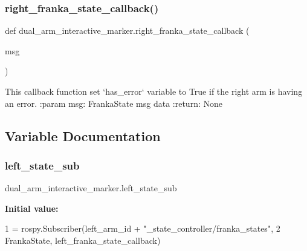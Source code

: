 \subsubsection{\texorpdfstring{right\+\_\+franka\+\_\+state\+\_\+callback()}{right\_franka\_state\_callback()}}
{\footnotesize\ttfamily def dual\+\_\+arm\+\_\+interactive\+\_\+marker.\+right\+\_\+franka\+\_\+state\+\_\+callback (\begin{DoxyParamCaption}\item[{}]{msg }\end{DoxyParamCaption})}

\begin{DoxyVerb}This callback function set `has_error` variable to True if the right arm is having an error.
:param msg: FrankaState msg data
:return:  None
\end{DoxyVerb}
 

\subsection{Variable Documentation}
\mbox{\label{namespacedual__arm__interactive__marker_ab3eaf7e9c4ecbae1e8dd0814de4cafe1}} 
\subsubsection{\texorpdfstring{left\+\_\+state\+\_\+sub}{left\_state\_sub}}
{\footnotesize\ttfamily dual\+\_\+arm\+\_\+interactive\+\_\+marker.\+left\+\_\+state\+\_\+sub}

{\bfseries Initial value\+:}
\begin{DoxyCode}
1 =  rospy.Subscriber(left\_arm\_id + \textcolor{stringliteral}{"\_state\_controller/franka\_states"},
2                                  FrankaState, left\_franka\_state\_callback)
\end{DoxyCode}
\mbox{\label{namespacedual__arm__interactive__marker_ab5b828c74287f71cf83aa46ffc2fc94b}} 

